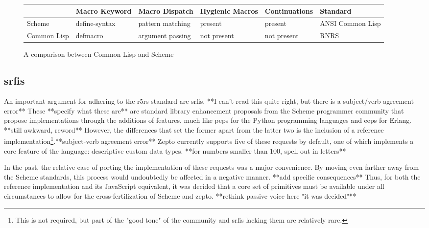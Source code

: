 \documentclass[oneside,11pt,xetex]{scrbook}
\begin{document}
\begin{center}
\begin{figure}
  \begin{tabu}{| l | l | l | l | l | l |}
  \hline
  \rowfont{\footnotesize}
              & Macro Keyword & Macro Dispatch   & Hygienic Macros & Continuations & Standard\\ \hline
  \rowfont{\footnotesize}
  Scheme      & define-syntax & pattern matching & present         & present       & ANSI Common Lisp\\ \hline
  \rowfont{\footnotesize}
  Common Lisp & defmacro      & argument passing & not present     & not present   & RNRS\\ \hline
  \end{tabu}
  \caption{A comparison between Common Lisp and Scheme}
\end{figure}
\label{fig:lispcomp}
\end{center}

\subsection{\glspl{srfi}}

An important argument for adhering to the \gls{r5rs} standard are \glspl{srfi}. **I can't read this quite right, but there is a subject/verb agreement error** These **specify what these are** are standard library enhancement proposals
from the Scheme programmer community that propose implementations through
the additions of features, much like \glspl{pep} for the Python programming languages and \glspl{eep}
for Erlang. **still awkward, reword** However, the differences that set the former apart from the latter two is the inclusion
of a reference implementation\footnote{This is not required, but part of the "good tone" of the community
and \gls{srfi}s lacking them are relatively rare.}.**subject-verb agreement error** Zepto currently supports five of these requests by default,
one of which implements a core feature of the language: descriptive custom data types. **for numbers smaller than 100, spell out in letters**

In the past, the relative ease of porting the implementation of these requests was a major convenience. By moving even farther away from the Scheme standards, this process would
undoubtedly be affected in a negative manner. **add specific consequences** Thus, for both the reference implementation and its
JavaScript equivalent, it was decided that a core set of primitives must be available under all circumstances
to allow for the cross-fertilization of Scheme and zepto. **rethink passive voice here "it was decided"**
\end{document}
